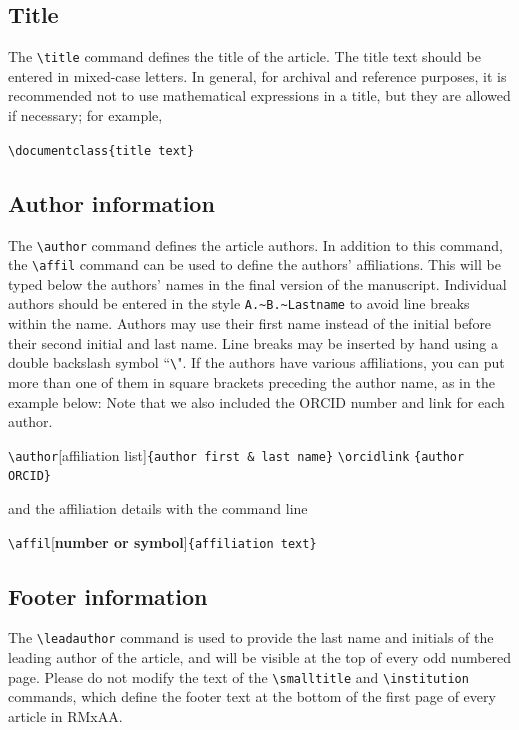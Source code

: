 \documentclass[9pt,twoside]{rmaa-rho-class/rmaa-rho}
\newcommand{\CS}[1]{\texttt{\textbackslash #1}}
\begin{document}
    \subsection{Title}

        The \CS{title} command defines the title of the article. The title text should be entered in mixed-case letters. In general, for archival and reference purposes, it is recommended not to use mathematical expressions in a title, but they are allowed if necessary; for example, 

        \bigskip
        \verb|\documentclass{title text}|
        \bigskip

    \subsection{Author information}
    
        The \CS{author} command defines the article authors. In addition to this command, the \CS{affil} command can be used to define the authors’ affiliations. This will be typed below the authors’ names in the final version of the manuscript. Individual authors should be entered in the style \texttt{A.\~{}B.\~{}Lastname} to avoid line breaks within the name. Authors may use their first name instead of the initial before their second initial and last name.  Line breaks may be inserted by hand using a double backslash symbol “\CS \CS". If the authors have various affiliations, you can put more than one of them in square brackets preceding the author name, as in the example below: Note that we also included the ORCID number and link for each author.
    
        \bigskip
        
        \CS{author}[{affiliation list}]\verb|{author first & last name}|  \CS{orcidlink} \verb|{author ORCID}|
        
        \bigskip
        and the affiliation details with the command line
        
        \bigskip
        \CS{affil}[\textbf{number or symbol}]\verb|{affiliation text}|

        \bigskip
    
    \subsection{Footer information}
    
        The \CS{leadauthor} command is used to provide the last name and initials of the leading author of the article, and will be visible at the top of every odd numbered page. Please do not modify the text of the \CS{smalltitle} and \CS{institution} commands, which define the footer text at the bottom of the first page of every article in RMxAA.
    
\end{document}
